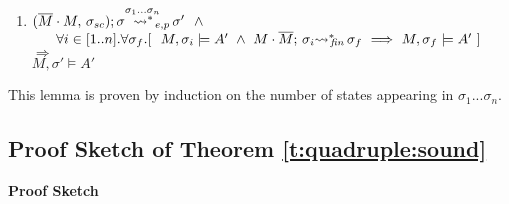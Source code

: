 {\begin{auxLemma}
\begin{enumerate}
\item
$ \WithExtPub {\Mtwo\cdot M} {\sigma\bd}  {\sigma}  {\sigma'} {\sigma_1...\sigma_n}\ \ \wedge $\\
 $\strut \ \ \ \  \  \forall i\in [1..n]. \forall \sigma_{f}.[ \ \  M, \sigma_i \models A'  \ \wedge \  \leadstoBoundedStarFin {M\cdot \Mtwo}  {\sigma_i}  {\sigma_{f}} \ 
\Longrightarrow \  M, \sigma_f \models A' \ ]$\\
$\Longrightarrow $
\\
$M, \sigma' \models A' $
\end{enumerate}

\end{auxLemma}

This lemma is proven by induction on the number of states appearing in ${\sigma_1...\sigma_n}$.

\subsection{Proof Sketch of Theorem \ref{t:quadruple:sound} }
\label{s:app:proof:sketch;quadruples}
\noindent
\vspace{.2cm}
  {\textbf{Proof Sketch}} 


}

